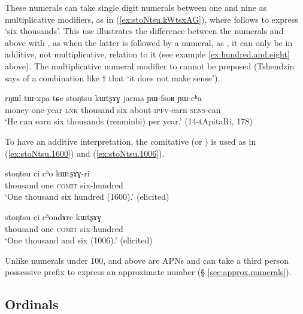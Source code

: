 These numerals can take single digit numerals between one and nine as multiplicative modifiers, as in (\ref{ex:stoNtsu.kWtsxAG}), where  follows   to express `six thousands'. This use illustrates the difference between the numerals  and above with , as when the latter is followed by a numeral, as , it can only be in additive, not multiplicative, relation to it (see example \ref{ex:hundred.and.eight} above). The multiplicative numeral modifier to  cannot be preposed (Tshendzin says of a combination like $\dagger$ that  `it does not make sense').

\begin{exe}
\ex  \label{ex:stoNtsu.kWtsxAG}
 \gll   rŋɯl tɯ-xpa tɕe stoŋtsu kɯtʂɤɣ jarma ɲɯ-fsoʁ ɲɯ-cʰa \\
 money one-year \textsc{lnk} thousand six about \textsc{ipfv}-earn \textsc{sens}-can \\
 \glt `He can earn six thousands (renminbi) per year.' (14-tApitaRi, 178)
 \end{exe}
 
 To have an additive interpretation, the comitative  (or ) is used as in (\ref{ex:stoNtsu.1600}) and (\ref{ex:stoNtsu.1006}).
 
  \begin{exe}
\ex  \label{ex:stoNtsu.1600}
 \gll  stoŋtsu ci cʰo kɯtʂɤɣ-ri \\
 thousand one \textsc{comit} six-hundred \\
 \glt `One thousand six hundred (1600).' (elicited)
  \end{exe}
  
    \begin{exe}
\ex  \label{ex:stoNtsu.1006}
 \gll  stoŋtsu ci cʰondɤre kɯtʂɤɣ \\
 thousand one \textsc{comit} six-hundred \\
 \glt `One thousand and six (1006).' (elicited)
  \end{exe}
 
Unlike numerals under 100,  and above are APNs and can take a third person possessive prefix  to express an approximate number (§ \ref{sec:approx.numerals}).

 \subsection{Ordinals} \label{sec:ordinals}
 
